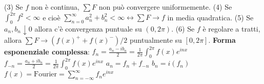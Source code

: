 \documentclass[fontsize=8pt]{scrartcl}
\begin{document}
\begin{multicols*}{4}
(3) Se $f$ non è continua, $\sum F$ non può convergere uniformemente.\newline
(4) Se $\int_{0}^{2\pi} f^2 < \infty$ e cioè $\sum_{n=0}^{\infty}a_n^2 + b_n^2 < \infty \leftrightarrow \sum F \rightarrow f$ in media quadratica.\newline
(5) Se $a_n, b_n \downarrow 0$ allora c'è convergenza puntuale su $(0,2\pi)$.\newline
(6) Se $f$ è regolare a tratti, allora $\sum F \rightarrow (f(x)^+ + f(x)^-)/2$ puntualmente su $[0,2\pi]$.
\textbf{Forma esponenziale complessa}:\newline
$f_n = \frac{a_n - i b_n}{2} = \frac{1}{2\pi} \int_{0}^{2\pi} f(x) e^{inx}$\newline
$f_{-n} = \frac{a_n + i b_n}{2} = \frac{1}{2\pi} \int_{0}^{2\pi} f(x) e^{inx}$\newline
$a_n = f_n + f_{-n}$\newline
$b_n = i(f_n)$\newline
$f(x) = \text{Fourier} = \sum_{n=-\infty}^{\infty} f_n e^{inx}$

\end{multicols*}
\end{document}
